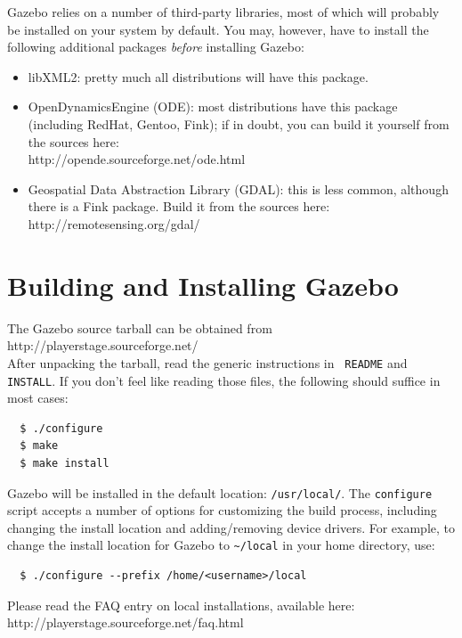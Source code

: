\documentclass[11pt]{report}
\begin{document}
Gazebo relies on a number of third-party libraries, most of which will
probably be installed on your system by default.  You may, however,
have to install the following additional packages {\em before}
installing Gazebo:
\begin{itemize}
%
\item libXML2: pretty much all distributions will have this package.
%
\item OpenDynamicsEngine (ODE): most distributions have this package
(including RedHat, Gentoo, Fink); if in doubt, you can build it
yourself from the sources here:
\\ \indent http://opende.sourceforge.net/ode.html \\
%
\item Geospatial Data Abstraction Library (GDAL): this is less common,
although there is a Fink package.  Build it from the sources here:
\\ \indent http://remotesensing.org/gdal/ \\
\end{itemize}


\section{Building and Installing Gazebo}

The Gazebo source tarball can be obtained from
  \\ \indent http://playerstage.sourceforge.net/ \\
After unpacking the tarball, read the generic instructions in {\tt
README} and {\tt INSTALL}.  If you don't feel like reading those
files, the following should suffice in most cases:
\begin{verbatim}
  $ ./configure
  $ make
  $ make install
\end{verbatim} %
Gazebo will be installed in the default location: {\tt /usr/local/}.
The {\tt configure} script accepts a number of options for customizing
the build process, including changing the install location and
adding/removing device drivers.  For example, to change the install
location for Gazebo to \verb+~/local+ in your home directory, use:
\begin{verbatim}
  $ ./configure --prefix /home/<username>/local
\end{verbatim} %
Please read the FAQ entry on local installations, available here:
\\ \indent http://playerstage.sourceforge.net/faq.html\\
\end{document}
